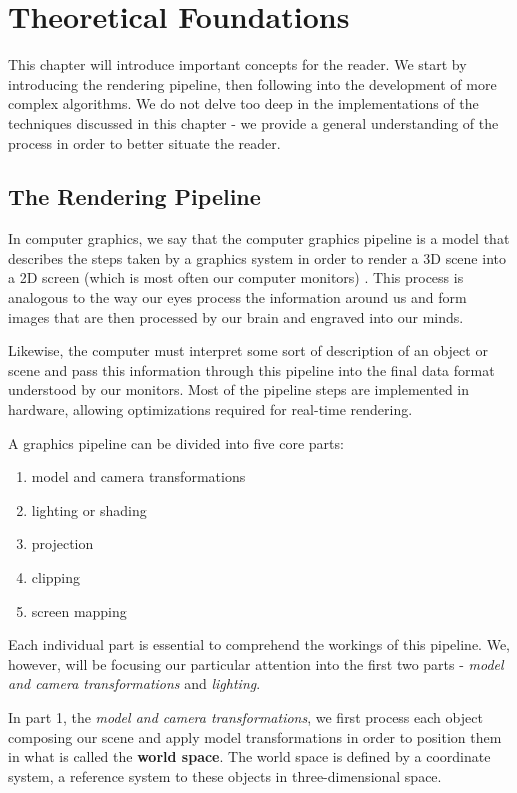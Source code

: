 \chapter{Theoretical Foundations}
\label{sec:theory}
This chapter will introduce important concepts for the reader. We start by introducing the rendering pipeline, then following into the development of more complex algorithms. We do not delve too deep in the implementations of the techniques discussed in this chapter - we provide a general understanding of the process in order to better situate the reader.

\section{The Rendering Pipeline}

In computer graphics, we say that the computer graphics pipeline is a model that describes the steps taken by a graphics system in order to render a 3D scene into a 2D screen (which is most often our computer monitors) \cite{Shreiner:2009}. This process is analogous to the way our eyes process the information around us and form images that are then processed by our brain and engraved into our minds.

Likewise, the computer must interpret some sort of description of an object or scene and pass this information through this pipeline into the final data format understood by our monitors. Most of the pipeline steps are implemented in hardware, allowing optimizations required for real-time rendering. 

A graphics pipeline can be divided into five core parts: 
\begin{enumerate}
 \item model and camera transformations
 \item lighting or shading
 \item projection
 \item clipping
 \item screen mapping
\end{enumerate}

Each individual part is essential to comprehend the workings of this pipeline. We, however, will be focusing our particular attention into the first two parts - \textit{model and camera transformations} and \textit{lighting}.

In part 1, the \textit{model and camera transformations}, we first process each object composing our scene and apply model transformations in order to position them in what is called the \textbf{world space}. The world space is defined by a coordinate system, a reference system to these objects in three-dimensional space.

